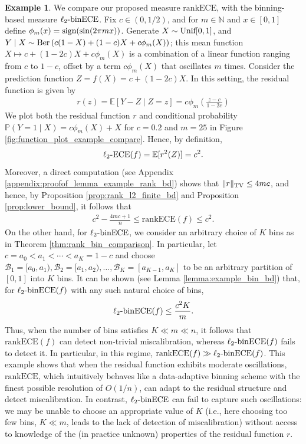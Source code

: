 \documentclass[11pt]{article}
\numberwithin{equation}{section}
\theoremstyle{definition}
\newtheorem{example}{Example}[section]
\newcommand{\E}{\mathbb{E}}
\renewcommand{\P}{\mathbb{P}}
\newcommand{\N}{\mathbb{N}}
\newcommand{\cB}{\mathcal{B}}
\newcommand{\ECE}{\mathrm{ECE}}
\newcommand{\lECE}{\ell_2\textnormal{-}\ECE}
\newcommand{\binECE}{\mathrm{binECE}}
\newcommand{\lbinECE}{\ell_2\textnormal{-}\binECE}
\newcommand{\rankECE}{\mathrm{rankECE}}
\begin{document}
\begin{example}\label{example:compare}
We compare our proposed measure $\rankECE$, with the binning-based measure $\lbinECE$. Fix $c\in (0, 1/2)$, and for $m\in \N$ and $x\in [0,1]$ define $\phi_m(x) = \textnormal{sign}(\sin(2\pi mx))$. Generate $X\sim \textnormal{Unif}[0,1]$, and $Y\mid X \sim \textnormal{Ber}\left(c(1-X) + (1-c)X + c\phi_m(X)\right)$; this mean function $X\mapsto c + (1-2c)X + c\phi_m(X)$ is a combination of a linear function ranging from $c$ to $1-c$, offset by a term $c\phi_m(X)$ that oscillates $m$ times. Consider the prediction function $Z = f(X)=c + (1-2c)X$. In this setting, the residual function is given by
\begin{align*}
    r(z) = \E[Y-Z\mid Z=z] = c\phi_m\left(\frac{z-c}{1-2c}\right)
\end{align*}
We plot both the residual function $r$ and conditional probability $\P(Y = 1\mid X) = c\phi_m(X) + X$ for $c = 0.2$ and $m = 25$ in Figure \ref{fig:function_plot_example_compare}. Hence, by definition,
    \[
        \lECE(f)=\E[r^2(Z)]=c^2.
    \]
    Moreover, a direct computation (see Appendix \ref{appendix:proofof_lemma_example_rank_bd}) shows that $\|r\|_{\textnormal{TV}}\leq 4mc$, and hence, by Proposition \ref{prop:rank_l2_finite_bd} and Proposition \ref{prop:lower_bound}, it follows that
    \begin{align*}
    c^2 - \frac{4mc + 1}{n}\leq \rankECE(f)\leq c^2.
    \end{align*}
    On the other hand, for $\lbinECE$, we consider an arbitrary choice of $K$ bins as in Theorem \ref{thm:rank_bin_comparison}. In particular, let $c = a_0<a_1<\cdots<a_{K} = 1-c$ and choose $\cB_1 = [a_0, a_1), \cB_2 = [a_1, a_2),\ldots, \cB_{K} = [a_{K-1}, a_K]$ to be an arbitrary partition of $[0, 1]$ into $K$ bins. It can be shown (see Lemma \ref{lemma:example_bin_bd}) that, for $\lbinECE(f)$ with any such natural choice of bins,
    \begin{align*}
    \lbinECE(f)\leq \frac{c^2K}{m}.
    \end{align*}
    Thus, when the number of bins satisfies $K\ll m\ll n$, it follows that $\rankECE(f)$ can detect non-trivial miscalibration, whereas $\lbinECE(f)$ fails to detect it. In particular, in this regime, $\rankECE(f)\gg\lbinECE(f)$. This example shows that when the residual function exhibits moderate oscillations, $\rankECE$, which intuitively behaves like a data-adaptive binning scheme with the finest possible resolution of $O(1/n)$, can adapt to the residual structure and detect miscalibration. In contrast, $\lbinECE$ can fail to capture such oscillations: we may be unable to choose an appropriate value of $K$ (i.e., here choosing too few bins, $K\ll m$, leads to the lack of detection of miscalibration) without access to knowledge of the (in practice unknown) properties of the residual function $r$.
\end{example}
\end{document}
